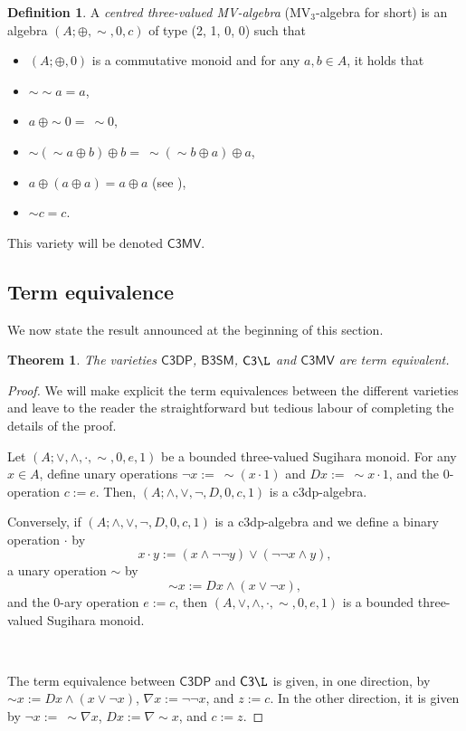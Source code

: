 \documentclass[a4paper,11pt]{article}
\newtheorem{thm}[theorem]{Theorem}
\theoremstyle{definition}
\newtheorem{defn}[theorem]{Definition}
\newcommand{\hdz}{\mathsf{C3DP}}
\newcommand{\ctl}{\mathsf{C3\L}}
\newcommand{\cmv}{\mathsf{C3MV}}
\newcommand{\vbtsm}{\mathsf{B3SM}}
\begin{document}
\begin{defn}
A \emph{centred three-valued MV-algebra} (MV$_3$-algebra for short) is an algebra $(A; \oplus, \sim, 0, c)$ of type (2, 1, 0, 0)  such that
	\begin{itemize}
		\item[]$(A; \oplus, 0)$ is a commutative monoid and for any $a, b \in A$, it holds that
			\item[]$\sim \sim a = a$,
			\item[]$a \ \oplus \sim 0 =\ \sim 0$,
			\item[]$\sim (\sim a \oplus b) \oplus b = \ \sim (\sim b \oplus a) \oplus a$,
			\item[]$a \oplus (a \oplus a) = a \oplus a$ (see \cite[Equation (MVn1) on p. 433]{AT}),
			\item[]$\sim c = c$.
	\end{itemize}
\end{defn}



\noindent This variety will be denoted $\cmv$.


\subsection{Term equivalence}

We now state the result announced at the beginning of this section.

\begin{thm}\label{MainThm}
The varieties $\hdz$, $\vbtsm$, $\ctl$ and $\cmv$ are term equivalent. 
\end{thm}
\begin{proof}
We will make explicit the term equivalences between the different varieties and leave to the reader the straightforward but tedious labour of completing the details of the proof.
	
Let $(A; \vee, \wedge, \cdot, \sim, 0, e, 1)$ be a bounded three-valued Sugihara monoid. 
For any $x \in A$, define unary operations $\neg x :=\ \sim (x \cdot 1)$ and $Dx :=\ \sim x \cdot 1$, and the $0$-operation $c:= e$. 
Then,  $(A; \wedge, \vee, \neg, D, 0, c, 1)$ is a c3dp-algebra.

Conversely, if $(A; \wedge, \vee, \neg, D, 0, c, 1)$ is a c3dp-algebra and we define a binary operation $\cdot$ by 
\[
x \cdot y := (x \wedge \neg \neg y) \vee (\neg \neg x \wedge y),
\]
a unary operation $\sim$ by
\[
\sim x := Dx \wedge (x \vee \neg x),
\]
and the $0$-ary operation $e:=c$,
then $(A, \vee, \wedge, \cdot, \sim, 0, e, 1)$ is a bounded three-valued Sugihara monoid.

\

The term equivalence between $\hdz$ and $\ctl$ is given, in one direction, by $\sim x := Dx \wedge (x \vee \neg x)$, $\nabla x := \neg \neg x$, and $z:=c$.
In the other direction, it is given by $\neg x :=\ \sim \nabla x$, $D x := \nabla \sim x$, and $c:=z$.
\end{proof}
\end{document}
